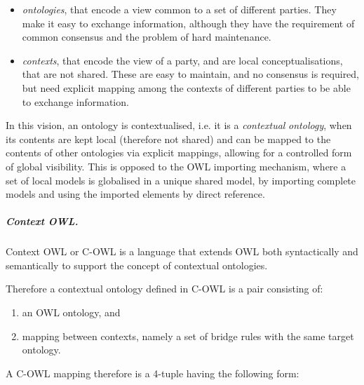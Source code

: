 \begin{itemize}
\item \textit{ontologies}, that encode a view common to a set of
different parties. They make it easy to exchange information, although
they have the requirement of common consensus and the problem of hard
maintenance. 
\item \textit{contexts}, that encode the view of a party, and are local
conceptualisations, that are not shared. These are easy to maintain,
and no consensus is required, but need explicit mapping among the
contexts of different parties to be able to exchange information. 
\end{itemize}
In this vision, an ontology is contextualised, i.e. it is a
\textit{contextual} \textit{ontology}, when its contents are kept local
(therefore not shared) and can be mapped to the contents of other
ontologies via explicit mappings, allowing for a controlled form of
global visibility. This is opposed to the OWL importing mechanism,
where a set of local models is globalised in a unique shared model, by
importing complete models and using the imported elements by direct
reference. 

\subparagraph{Context OWL.}
Context OWL or C-OWL is a language that extends OWL both syntactically
and semantically to support the concept of contextual ontologies. 

Therefore a contextual ontology defined in C-OWL is a pair consisting
of: 

\begin{enumerate}
\item an OWL ontology, and 
\item mapping between contexts, namely a set of bridge rules with the
same target ontology. 
\end{enumerate}
A C-OWL mapping therefore is a 4-tuple having the following form: 

